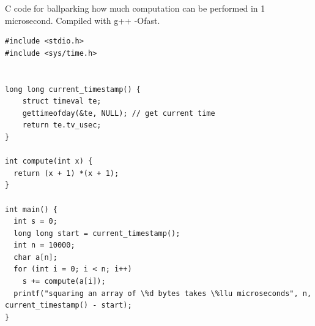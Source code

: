 \documentclass[11pt]{book} %
\begin{document}
C code for ballparking how much computation can be performed in 1 microsecond.
Compiled with g++ -Ofast.
\begin{lstlisting}
#include <stdio.h>
#include <sys/time.h>


long long current_timestamp() {
    struct timeval te; 
    gettimeofday(&te, NULL); // get current time
    return te.tv_usec;
}

int compute(int x) {
  return (x + 1) *(x + 1);
}

int main() {
  int s = 0;
  long long start = current_timestamp(); 
  int n = 10000;
  char a[n];
  for (int i = 0; i < n; i++)
    s += compute(a[i]);
  printf("squaring an array of \%d bytes takes \%llu microseconds", n, current_timestamp() - start);
}
\end{lstlisting}


\newpage

\end{document}
